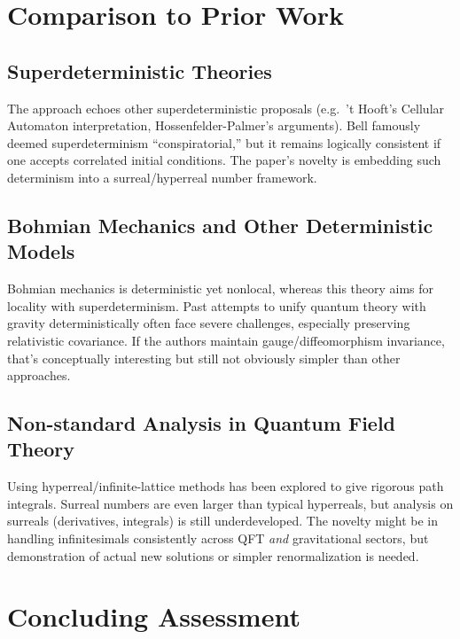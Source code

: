 \documentclass[11pt]{article}
\begin{document}
\section{Comparison to Prior Work}

\subsection{Superdeterministic Theories}
The approach echoes other superdeterministic proposals (e.g.\ 't Hooft's Cellular Automaton interpretation, Hossenfelder-Palmer's arguments). Bell famously deemed superdeterminism ``conspiratorial,'' but it remains logically consistent if one accepts correlated initial conditions. The paper’s novelty is embedding such determinism into a surreal/hyperreal number framework.

\subsection{Bohmian Mechanics and Other Deterministic Models}
Bohmian mechanics is deterministic yet nonlocal, whereas this theory aims for locality with superdeterminism. Past attempts to unify quantum theory with gravity deterministically often face severe challenges, especially preserving relativistic covariance. If the authors maintain gauge/diffeomorphism invariance, that’s conceptually interesting but still not obviously simpler than other approaches.

\subsection{Non-standard Analysis in Quantum Field Theory}
Using hyperreal/infinite-lattice methods has been explored to give rigorous path integrals. Surreal numbers are even larger than typical hyperreals, but analysis on surreals (derivatives, integrals) is still underdeveloped. The novelty might be in handling infinitesimals consistently across QFT \emph{and} gravitational sectors, but demonstration of actual new solutions or simpler renormalization is needed.

\section{Concluding Assessment}
\end{document}

